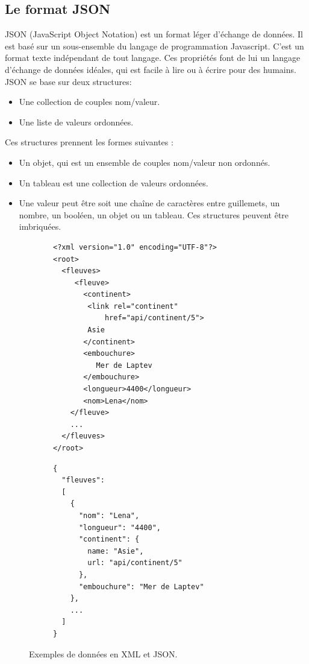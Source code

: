 \subsection{Le format JSON}
JSON (JavaScript Object Notation) est un format léger d'échange de données. Il est basé sur un sous-ensemble du langage de programmation Javascript. C'est un format texte indépendant de tout langage.
Ces propriétés font de lui un langage d'échange de données idéales, qui est facile à lire ou à écrire pour des humains. 
JSON se base sur deux structures:
\begin{itemize}
	\item Une collection de couples nom/valeur. 
	\item Une liste de valeurs ordonnées. 
\end{itemize}
Ces structures prennent les formes suivantes :
\begin{itemize}
	\item Un objet, qui est un ensemble de couples nom/valeur non ordonnés. 
	\item Un tableau est une collection de valeurs ordonnées. 
	\item Une valeur peut être soit une chaîne de caractères entre guillemets, un nombre, un booléen, un objet ou un tableau. Ces structures peuvent être imbriquées.
	      
\end{itemize}

\lstset{style=JSON}

\begin{figure}[h!]
  \centering
  \begin{subfigure}[b]{0.52\linewidth}
      \begin{lstlisting}[caption=Exemple en XML]
<?xml version="1.0" encoding="UTF-8"?>
<root>
  <fleuves>
     <fleuve>
       <continent>
        <link rel="continent" 
       		href="api/continent/5">
       	Asie
       </continent>
       <embouchure>
          Mer de Laptev
       </embouchure>
       <longueur>4400</longueur>
       <nom>Lena</nom>
    </fleuve>
    ...
  </fleuves>
</root>
\end{lstlisting}
  \end{subfigure}\hfill%
  \begin{subfigure}[b]{0.40\linewidth}
      \begin{lstlisting}[caption=Equivalent en JSON]
{
  "fleuves":
  [
    {
      "nom": "Lena",
      "longueur": "4400",
      "continent": {
      	name: "Asie",
      	url: "api/continent/5"
      },
      "embouchure": "Mer de Laptev"
    },
    ...
  ]
}       
\end{lstlisting}
\end{subfigure}\hfill%
\caption{Exemples de données en XML et JSON.}
\label{ref:JSONXML}
\end{figure}


